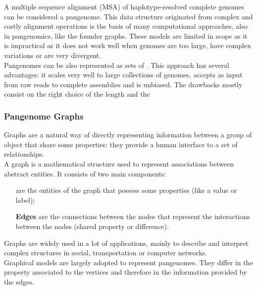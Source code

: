 A multiple sequence alignment (MSA) of haplotype-resolved complete genomes can be considered a pangenome. This data structure originated from complex and costly alignment operations is the basis of many computational approaches, also in pangenomics, like the founder graphs. These models are limited in scope as it is impractical as it does not work well when genomes are too large, have complex variations or are very divergent.\\
Pangenomes can be also represented as sets of \kmers. This approach has several advantages: it scales very well to large collections of genomes, accepts as input from raw reads to complete assemblies and is unbiased. The drawbacks mostly consist on the right choice of the \kmer length and the 

\subsubsection{Pangenome Graphs}
Graphs are a natural way of directly representing information between a group of object that share some properties: they provide a human interface to a set of relationships. \\
A graph is a mathematical structure used to represent associations between abstract entities. It consists of two main components:
\begin{itemize}[leftmargin=1.8cm]
	\item[\smash{\stackunder{\textbf{Nodes}}{\textbf{(vertices)}}}] are the entities of the graph that possess some properties (like a value or label);
	\item[\textbf{Edges}] are the connections between the nodes that represent the interactions between the nodes (shared property or difference).
\end{itemize}
Graphs are widely used in a lot of applications, mainly to describe and interpret complex structures in social, transportation or computer networks.\\
Graphical models are largely adopted to represent pangenomes. They differ in the property associated to the vertices and therefore in the information provided by the edges.
